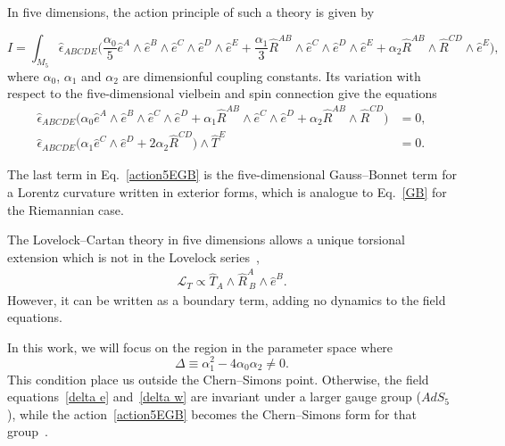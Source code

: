 \documentclass[aps,prd,12pt,superscriptaddress,showpacs,showkeys,longbibliography,reprint,nofootinbib]{revtex4-1}
\begin{document}
In five dimensions, the action principle of such a theory is given by  
\begin{widetext}
  \begin{equation}
    \label{action5EGB}
    I = \int_{M_5} \hat{\epsilon}_{ABCDE} \Big(\frac{\alpha_0}{5}\hat{e}^A\wedge\hat{e}^B\wedge\hat{e}^C\wedge
    \hat{e}^D\wedge\hat{e}^E
    +\frac{\alpha_1}{3}\hat{R}^{AB}\wedge\hat{e}^C\wedge\hat{e}^D\wedge\hat{e}^E
    +\alpha_2\hat{R}^{AB}\wedge\hat{R}^{CD}
    \wedge\hat{e}^E\Big),
  \end{equation}
  where $\alpha_0$, $\alpha_1$ and $\alpha_2$ are dimensionful coupling constants. Its variation with respect to the five-dimensional vielbein and spin connection give the equations
  \begin{align}
    \label{delta e}
    \hat{\epsilon}_{ABCDE}\Big(\alpha_0\hat{e}^A\wedge\hat{e}^B\wedge\hat{e}^C\wedge\hat{e}^D
    + \alpha_1\hat{R}^{AB}\wedge\hat{e}^C\wedge\hat{e}^D
    + \alpha_2\hat{R}^{AB}\wedge\hat{R}^{CD}\Big)&=0,
    \\
    \label{delta w}
    \hat{\epsilon}_{ABCDE}\Big(\alpha_1\hat{e}^C\wedge\hat{e}^D+
    2\alpha_2\hat{R}^{CD}\Big)\wedge\hat{T}^E&=0.
  \end{align}
\end{widetext}

The last term in Eq.~\eqref{action5EGB} is the five-dimensional Gauss--Bonnet term for a Lorentz curvature written in exterior forms, which is analogue to Eq.~\eqref{GB} for the Riemannian case.

The Lovelock--Cartan theory in five dimensions allows a unique torsional extension which is not in the Lovelock series~\cite{Mardones:1990qc},
\begin{align}
  \label{boundary}
  \mathcal{L}_{T} \propto \hat{T}_A\wedge \hat{R}^A_{\ B}\wedge\hat{e}^B.
\end{align}
However, it can be written as a boundary term, adding no dynamics to the field equations.

In this work, we will focus on the region in the parameter space where
\begin{equation}\label{delta}
  \Delta\equiv\alpha_1^2-4\alpha_0\alpha_2\neq 0.
\end{equation}
This condition place us outside the Chern--Simons point. Otherwise, the field equations~\eqref{delta e} and~\eqref{delta w} are invariant under a larger gauge group ($AdS_5$), while the action~\eqref{action5EGB} becomes the Chern--Simons form for that group~\cite{Zanelli:2005sa,Troncoso:1999pk}. 
\end{document}
